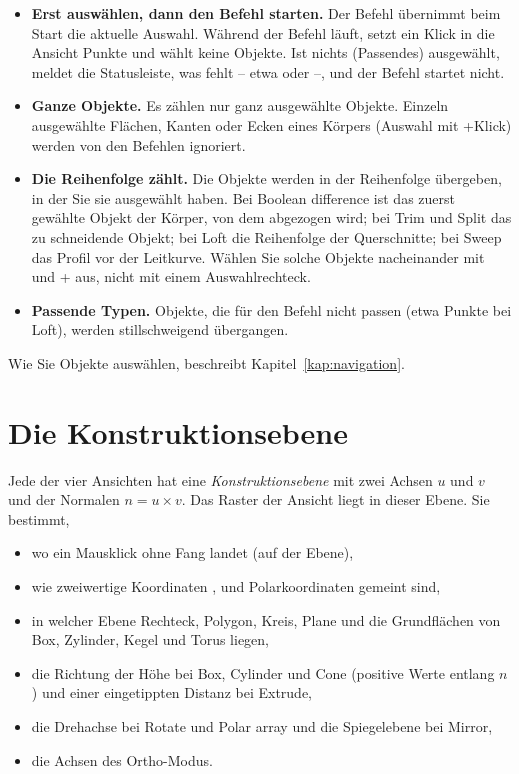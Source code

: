 \begin{itemize}
\item \textbf{Erst auswählen, dann den Befehl starten.} Der Befehl übernimmt beim Start die
  aktuelle Auswahl. Während der Befehl läuft, setzt ein Klick in die Ansicht Punkte und wählt
  keine Objekte. Ist nichts (Passendes) ausgewählt, meldet die Statusleiste, was fehlt -- etwa
   oder  --, und der Befehl startet nicht.
\item \textbf{Ganze Objekte.} Es zählen nur ganz ausgewählte Objekte. Einzeln ausgewählte
  Flächen, Kanten oder Ecken eines Körpers (Auswahl mit +Klick) werden von den
  Befehlen ignoriert.
\item \textbf{Die Reihenfolge zählt.} Die Objekte werden in der Reihenfolge übergeben, in der
  Sie sie ausgewählt haben. Bei Boolean difference ist das zuerst gewählte Objekt der Körper,
  von dem abgezogen wird; bei Trim und Split das zu schneidende Objekt; bei Loft die Reihenfolge
  der Querschnitte; bei Sweep das Profil vor der Leitkurve. Wählen Sie solche Objekte
  nacheinander mit  und + aus, nicht mit einem
  Auswahlrechteck.
\item \textbf{Passende Typen.} Objekte, die für den Befehl nicht passen (etwa Punkte bei Loft),
  werden stillschweigend übergangen.
\end{itemize}

Wie Sie Objekte auswählen, beschreibt Kapitel~\ref{kap:navigation}.

\section{Die Konstruktionsebene}\label{sec:mod-konstruktionsebene}

Jede der vier Ansichten hat eine \emph{Konstruktionsebene} mit zwei Achsen $u$ und $v$ und der
Normalen $n = u \times v$. Das Raster der Ansicht liegt in dieser Ebene. Sie bestimmt,

\begin{itemize}
\item wo ein Mausklick ohne Fang landet (auf der Ebene),
\item wie zweiwertige Koordinaten ,  und Polarkoordinaten gemeint sind,
\item in welcher Ebene Rechteck, Polygon, Kreis, Plane und die Grundflächen von Box, Zylinder,
  Kegel und Torus liegen,
\item die Richtung der Höhe bei Box, Cylinder und Cone (positive Werte entlang $n$) und einer
  eingetippten Distanz bei Extrude,
\item die Drehachse bei Rotate und Polar array und die Spiegelebene bei Mirror,
\item die Achsen des Ortho-Modus.
\end{itemize}

